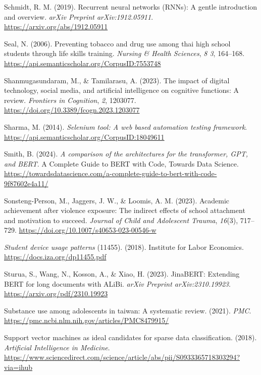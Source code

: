 \documentclass[
  titlepage]{article}
\newlength{\cslhangindent}
\newenvironment{CSLReferences}[2] %
 {\begin{list}{}{%
  \setlength{\itemindent}{0pt}
  \setlength{\leftmargin}{0pt}
  \setlength{\parsep}{0pt}
  \ifodd #1
   \setlength{\leftmargin}{\cslhangindent}
   \setlength{\itemindent}{-1\cslhangindent}
  \fi
  \setlength{\itemsep}{#2\baselineskip}}}
 {\end{list}}
\begin{document}
\begin{CSLReferences}{1}{0}
Schmidt, R. M. (2019). Recurrent neural networks (RNNs): A gentle
introduction and overview. \emph{arXiv Preprint arXiv:1912.05911}.
\url{https://arxiv.org/abs/1912.05911}

Seal, N. (2006). Preventing tobacco and drug use among thai high school
students through life skills training. \emph{Nursing \& Health
Sciences}, \emph{8 3}, 164--168.
\url{https://api.semanticscholar.org/CorpusID:7553748}

Shanmugasundaram, M., \& Tamilarasu, A. (2023). The impact of digital
technology, social media, and artificial intelligence on cognitive
functions: A review. \emph{Frontiers in Cognition}, \emph{2}, 1203077.
\url{https://doi.org/10.3389/fcogn.2023.1203077}

Sharma, M. (2014). \emph{Selenium tool: A web based automation testing
framework}. \url{https://api.semanticscholar.org/CorpusID:18049611}

Smith, B. (2024). \emph{A comparison of the architectures for the
transformer, GPT, and BERT}. A Complete Guide to BERT with Code, Towards
Data Science.
\url{https://towardsdatascience.com/a-complete-guide-to-bert-with-code-9f87602e4a11/}

Sonsteng-Person, M., Jaggers, J. W., \& Loomis, A. M. (2023). Academic
achievement after violence exposure: The indirect effects of school
attachment and motivation to succeed. \emph{Journal of Child and
Adolescent Trauma}, \emph{16}(3), 717--729.
\url{https://doi.org/10.1007/s40653-023-00546-w}

\emph{Student device usage patterns} (11455). (2018). Institute for
Labor Economics. \url{https://docs.iza.org/dp11455.pdf}

Sturua, S., Wang, N., Kosson, A., \& Xiao, H. (2023). JinaBERT:
Extending BERT for long documents with ALiBi. \emph{arXiv Preprint
arXiv:2310.19923}. \url{https://arxiv.org/pdf/2310.19923}

Substance use among adolescents in taiwan: A systematic review. (2021).
\emph{PMC}. \url{https://pmc.ncbi.nlm.nih.gov/articles/PMC8479915/}

Support vector machines as ideal candidates for sparse data
classification. (2018). \emph{Artificial Intelligence in Medicine}.
\url{https://www.sciencedirect.com/science/article/abs/pii/S0933365718303294?via=ihub}


\end{CSLReferences}
\end{document}
